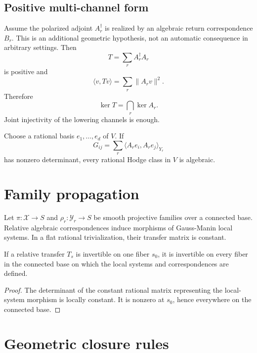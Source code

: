 \section{Positive multi-channel form}
Assume the polarized adjoint $A_r^\dagger$ is realized by an algebraic return correspondence $B_r$. This is an additional geometric hypothesis, not an automatic consequence in arbitrary settings. Then
\[
T=\sum_rA_r^\dagger A_r
\]
is positive and
\[
\langle v,Tv\rangle=\sum_r\|A_rv\|^2.
\]
Therefore
\[
\ker T=\bigcap_r\ker A_r.
\]
Joint injectivity of the lowering channels is enough.





\begin{corollary}
Choose a rational basis $e_1,\ldots,e_d$ of $V$. If
\[
G_{ij}=\sum_r\langle A_re_i,A_re_j\rangle_{Y_r}
\]
has nonzero determinant, every rational Hodge class in $V$ is algebraic.
\end{corollary}

\chapter{Family propagation}
Let $\pi:\mathcal X\to S$ and $\rho_r:\mathcal Y_r\to S$ be smooth projective families over a connected base. Relative algebraic correspondences induce morphisms of Gauss-Manin local systems. In a flat rational trivialization, their transfer matrix is constant.

\begin{theorem}
If a relative transfer $T_s$ is invertible on one fiber $s_0$, it is invertible on every fiber in the connected base on which the local systems and correspondences are defined.
\end{theorem}
\begin{proof}
The determinant of the constant rational matrix representing the local-system morphism is locally constant. It is nonzero at $s_0$, hence everywhere on the connected base.
\end{proof}




\chapter{Geometric closure rules}
